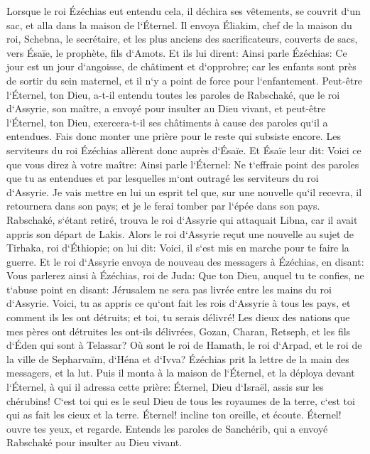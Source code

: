 \verse Lorsque le roi Ézéchias eut entendu cela, il déchira ses vêtements, se couvrit d`un sac, et alla dans la maison de l`Éternel. 
\verse Il envoya Éliakim, chef de la maison du roi, Schebna, le secrétaire, et les plus anciens des sacrificateurs, couverts de sacs, vers Ésaïe, le prophète, fils d`Amots. 
\verse Et ils lui dirent: Ainsi parle Ézéchias: Ce jour est un jour d`angoisse, de châtiment et d`opprobre; car les enfants sont près de sortir du sein maternel, et il n`y a point de force pour l`enfantement. 
\verse Peut-être l`Éternel, ton Dieu, a-t-il entendu toutes les paroles de Rabschaké, que le roi d`Assyrie, son maître, a envoyé pour insulter au Dieu vivant, et peut-être l`Éternel, ton Dieu, exercera-t-il ses châtiments à cause des paroles qu`il a entendues. Fais donc monter une prière pour le reste qui subsiste encore. 
\verse Les serviteurs du roi Ézéchias allèrent donc auprès d`Ésaïe. 
\verse Et Ésaïe leur dit: Voici ce que vous direz à votre maître: Ainsi parle l`Éternel: Ne t`effraie point des paroles que tu as entendues et par lesquelles m`ont outragé les serviteurs du roi d`Assyrie. 
\verse Je vais mettre en lui un esprit tel que, sur une nouvelle qu`il recevra, il retournera dans son pays; et je le ferai tomber par l`épée dans son pays. 
\verse Rabschaké, s`étant retiré, trouva le roi d`Assyrie qui attaquait Libna, car il avait appris son départ de Lakis. 
\verse Alors le roi d`Assyrie reçut une nouvelle au sujet de Tirhaka, roi d`Éthiopie; on lui dit: Voici, il s`est mis en marche pour te faire la guerre. Et le roi d`Assyrie envoya de nouveau des messagers à Ézéchias, en disant: 
\verse Vous parlerez ainsi à Ézéchias, roi de Juda: Que ton Dieu, auquel tu te confies, ne t`abuse point en disant: Jérusalem ne sera pas livrée entre les mains du roi d`Assyrie. 
\verse Voici, tu as appris ce qu`ont fait les rois d`Assyrie à tous les pays, et comment ils les ont détruits; et toi, tu serais délivré! 
\verse Les dieux des nations que mes pères ont détruites les ont-ils délivrées, Gozan, Charan, Retseph, et les fils d`Éden qui sont à Telassar? 
\verse Où sont le roi de Hamath, le roi d`Arpad, et le roi de la ville de Sepharvaïm, d`Héna et d`Ivva? 
\verse Ézéchias prit la lettre de la main des messagers, et la lut. Puis il monta à la maison de l`Éternel, et la déploya devant l`Éternel, 
\verse à qui il adressa cette prière: Éternel, Dieu d`Israël, assis sur les chérubins! C`est toi qui es le seul Dieu de tous les royaumes de la terre, c`est toi qui as fait les cieux et la terre. 
\verse Éternel! incline ton oreille, et écoute. Éternel! ouvre tes yeux, et regarde. Entends les paroles de Sanchérib, qui a envoyé Rabschaké pour insulter au Dieu vivant. 
